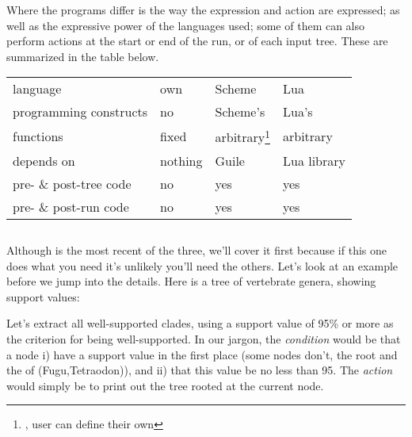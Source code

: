 Where the programs differ is the way the expression and action are expressed; as
well as the expressive power of the languages used; some of them can also
perform actions at the start or end of the run, or of each input tree. These are
summarized in the table below.

\startalignment[center]
	\begin{minipage}{0.8\textwidth}
		\renewcommand{\thefootnote}{\thempfootnote}
		\begin{tabular}{llll}
		& \ed & \sched & \luaed \\
		\hline
		language & own & Scheme & Lua \\
		programming constructs & no & Scheme's & Lua's \\
		functions & fixed & arbitrary\footnote{\ie, user can define their own} &
		arbitrary\footnotemark[\value{mpfootnote}] \\
		depends on & nothing & \gnu{} Guile & Lua library \\
		pre- \& post-tree code & no & yes & yes \\
		pre- \& post-run code & no & yes & yes
		\end{tabular}
	\end{minipage}
\stopalignment

\subsection[sct:luaed]{\luaed}


Although \luaed{} is the most recent of the three, we'll cover it first because
if this one does what you need it's unlikely you'll need the others.  Let's look
at an example before we jump into the details. Here is a tree of vertebrate
genera, showing support values:

\startalignment[center]
\externalfigure[ed_1_svg]
\stopalignment

Let's extract all well-supported clades, using a support value of
95\% or more as the criterion for being well-supported. In our jargon, the
{\em condition} would be that a node i) have a support value in the first place
(some nodes don't, \eg{} the root and the \lca{} of (Fugu,Tetraodon)), and ii)
that this value be no less than 95. The {\em action} would simply be to print
out the tree rooted at the current node.

\page[no]


